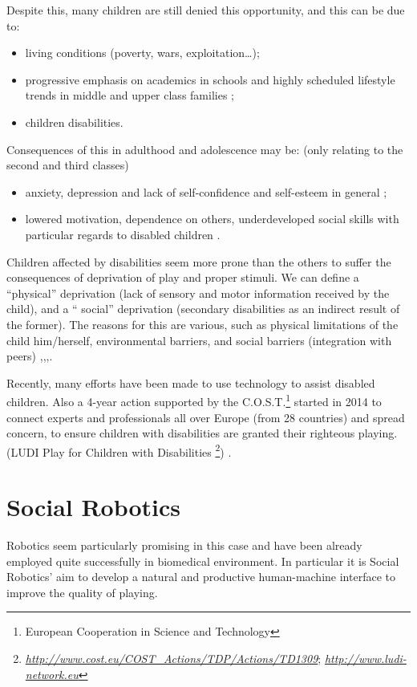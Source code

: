 \documentclass[a4paper,twoside]{book}
\begin{document}
\beforelist* Despite this, many children are still denied this opportunity, and this can be due to:
\begin{itemize}
\item living conditions (poverty, wars, exploitation\ldots);
\item progressive emphasis on academics in schools and highly scheduled lifestyle trends in middle and upper class families \cite{art4};
\item children disabilities.
\end{itemize}
\afterlist*
\beforelist* Consequences of this in adulthood and adolescence may be: (only relating to the second and third classes)
\begin{itemize}
\item  anxiety, depression and lack of self-confidence and self-esteem in general \cite{art4};
\item lowered motivation, dependence on others, underdeveloped social skills with particular regards to disabled children \cite{art9}.
\end{itemize}
\afterlist*
Children affected by disabilities seem more prone than the others to suffer the consequences of deprivation of play and proper stimuli. We can define a  \textquotedblleft{}physical\textquotedblright{} deprivation (lack of sensory and motor information received by the child), and a \textquotedblleft
 social\textquotedblright{} deprivation (secondary disabilities as an indirect result of the former). The reasons for this are various, such as physical limitations of the child him/herself, environmental barriers, and social barriers (integration with peers) \cite{art2},\cite{art4},\cite{art8},\cite{art9}.

Recently, many efforts have been made to use technology to assist disabled children. Also a 4-year action supported by the C.O.S.T.\footnote{European Cooperation in Science and Technology} started in 2014 to connect experts and professionals all over Europe (from 28 countries) and spread concern, to ensure children with disabilities are granted their righteous playing. (LUDI \textemdash Play for Children with Disabilities \footnote{\textit\underline{http://www.cost.eu/COST\_Actions/TDP/Actions/TD1309}; \textit\underline{http://www.ludi-network.eu}}) \cite{art3}.

\section{Social Robotics}
Robotics seem particularly promising in this case and have been already employed quite successfully in biomedical environment. In particular it is Social Robotics' aim to develop a natural and productive human-machine interface to improve the quality of playing.
 
\end{document}
